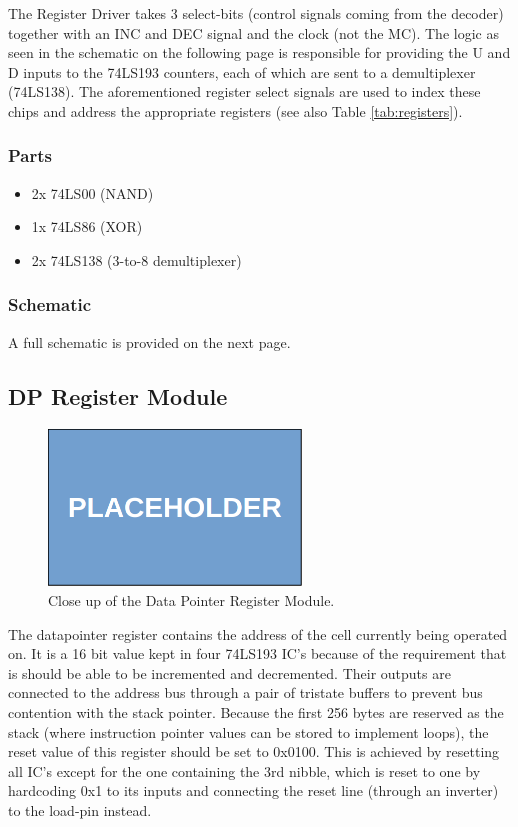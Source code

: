 The Register Driver takes 3 select-bits (control signals coming from the decoder) together with an INC and DEC signal and the clock (not the MC). The logic as seen in the schematic on the following page is responsible for providing the U and D inputs to the 74LS193 counters, each of which are sent to a demultiplexer (74LS138). The aforementioned register select signals are used to index these chips and address the appropriate registers (see also Table \ref{tab:registers}).

\subsubsection*{Parts}
\begin{itemize}\itemsep0em
\item 2x 74LS00 (NAND)
\item 1x 74LS86 (XOR)
\item 2x 74LS138 (3-to-8 demultiplexer)
\end{itemize}

\subsubsection*{Schematic}
A full schematic is provided on the next page.



\subsection{DP Register Module}
\begin{figure}[H]
  \centering
  \includegraphics[width=0.6\textwidth]{img/placeholder}
  \caption{Close up of the Data Pointer Register Module.}
  \label{fig:dpregcloseup}
\end{figure}

The datapointer register contains the address of the cell currently being operated on. It is a 16 bit value kept in four 74LS193 IC's because of the requirement that is should be able to be incremented and decremented. Their outputs are connected to the address bus through a pair of tristate buffers to prevent bus contention with the stack pointer. Because the first 256 bytes are reserved as the stack (where instruction pointer values can be stored to implement loops), the reset value of this register should be set to 0x0100. This is achieved by resetting all IC's except for the one containing the 3rd nibble, which is reset to one by hardcoding 0x1 to its inputs and connecting the reset line (through an inverter) to the load-pin instead.

